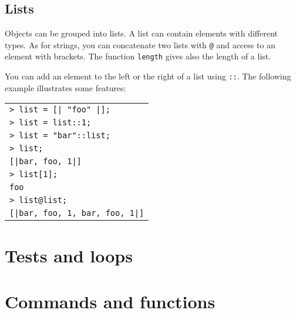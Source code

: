 \documentclass[a4paper]{article}
\newcommand{\com}[1]{\texttt{#1}}
\newcommand{\code}[1]{
\begin{center}
\begin{tabular}{|p{14.8cm}|}
\hline
#1
\hline
\end{tabular}
\end{center}
}
\newcommand{\ligne}[1]{\texttt{#1}\\}
\begin{document}
\subsection{Lists}
Objects can be grouped into lists. A list can contain elements with different types. As for strings, you can concatenate two lists with \com{@} and access to an element with brackets. The function \com{length} gives also the length of a list.

You can add an element to the left or the right of a list using \com{::}. The following example illustrates some features:

\code{
\ligne{> list = [| "foo" |];}
\ligne{> list = list::1;}
\ligne{> list = "bar"::list;}
\ligne{> list;}
\ligne{[|bar, foo, 1|]}
\ligne{> list[1];}
\ligne{foo}
\ligne{> list@list;}
\ligne{[|bar, foo, 1, bar, foo, 1|]}
}

\section{Tests and loops}

\section{Commands and functions}


\end{document}
